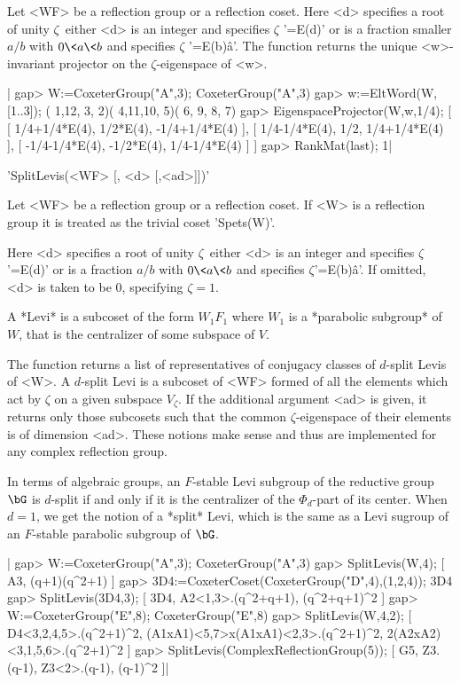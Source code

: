 Let  <WF> be a reflection group or a reflection coset. Here <d> specifies a
root  of unity  $\zeta$\:\ either  <d> is  an integer and specifies $\zeta$
'=E(d)' or is a fraction smaller $a/b$ with $0\<a\<b$ and specifies $\zeta$
'=E(b)\^a'.  The function returns the unique <w>-invariant projector on the
$\zeta$-eigenspace of <w>.

|    gap> W:=CoxeterGroup("A",3);
    CoxeterGroup("A",3)
    gap> w:=EltWord(W,[1..3]);
    ( 1,12, 3, 2)( 4,11,10, 5)( 6, 9, 8, 7)
    gap> EigenspaceProjector(W,w,1/4);
    [ [ 1/4+1/4*E(4), 1/2*E(4), -1/4+1/4*E(4) ],
      [ 1/4-1/4*E(4), 1/2, 1/4+1/4*E(4) ],
      [ -1/4-1/4*E(4), -1/2*E(4), 1/4-1/4*E(4) ] ]
    gap> RankMat(last);
    1|


'SplitLevis(<WF> [, <d> [,<ad>]])'

Let  <WF>  be  a  reflection  group  or  a  reflection  coset.  If <W> is a
reflection  group it is  treated as the  trivial coset 'Spets(W)'.

Here  <d> specifies a root of unity $\zeta$\:\ either <d> is an integer and
specifies  $\zeta$'=E(d)'  or  is  a  fraction  $a/b$  with  $0\<a\<b$  and
specifies $\zeta$'=E(b)\^a'. If omitted, <d> is taken to be $0$, specifying
$\zeta=1$.

A  *Levi* is a  subcoset of the  form $W_1F_1$ where  $W_1$ is a *parabolic
subgroup* of $W$, that is the centralizer of some subspace of $V$.

The  function returns  a list  of representatives  of conjugacy  classes of
$d$-split  Levis of <W>. A  $d$-split Levi is a  subcoset of <WF> formed of
all the elements which act by $\zeta$ on a given subspace $V_\zeta$. If the
additional  argument <ad>  is given,  it returns  only those subcosets such
that  the common $\zeta$-eigenspace of their elements is of dimension <ad>.
These  notions  make  sense  and  thus  are  implemented  for  any  complex
reflection group.

In  terms of algebraic groups, an $F$-stable Levi subgroup of the reductive
group  $\bG$  is  $d$-split  if  and  only  if it is the centralizer of the
$\Phi_d$-part  of its center.  When $d=1$, we  get the notion  of a *split*
Levi,  which  is  the  same  as  a  Levi sugroup of an $F$-stable parabolic
subgroup of $\bG$.

|    gap> W:=CoxeterGroup("A",3);
    CoxeterGroup("A",3)
    gap> SplitLevis(W,4);
    [ A3, (q+1)(q^2+1) ]
    gap> 3D4:=CoxeterCoset(CoxeterGroup("D",4),(1,2,4));
    3D4
    gap> SplitLevis(3D4,3);
    [ 3D4, A2<1,3>.(q^2+q+1), (q^2+q+1)^2 ]
    gap> W:=CoxeterGroup("E",8);
    CoxeterGroup("E",8)
    gap> SplitLevis(W,4,2);
    [ D4<3,2,4,5>.(q^2+1)^2, (A1xA1)<5,7>x(A1xA1)<2,3>.(q^2+1)^2,
      2(A2xA2)<3,1,5,6>.(q^2+1)^2 ]
    gap> SplitLevis(ComplexReflectionGroup(5));
    [ G5, Z3.(q-1), Z3<2>.(q-1), (q-1)^2 ]|

